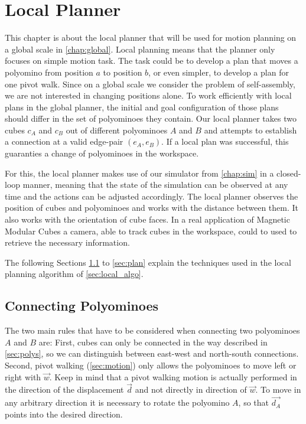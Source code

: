 \chapter{Local Planner}
\label{chap:local}

This chapter is about the local planner that will be used for motion planning on a global scale in \autoref{chap:global}.
Local planning means that the planner only focuses on simple motion task.
The task could be to develop a plan that moves a polyomino from position $a$ to position $b$, or even simpler, to develop a plan for one pivot walk.
Since on a global scale we consider the problem of self-assembly, we are not interested in changing positions alone.
To work efficiently with local plans in the global planner, the initial and goal configuration of those plans should differ in the set of polyominoes they contain.
Our local planner takes two cubes $c_A$ and $c_B$ out of different polyominoes $A$ and $B$ and attempts to establish a connection at a valid edge-pair $(e_A, e_B)$.
If a local plan was successful, this guaranties a change of polyominoes in the workspace.

For this, the local planner makes use of our simulator from \autoref{chap:sim} in a closed-loop manner, meaning that the state of the simulation can be observed at any time and the actions can be adjusted accordingly.
The local planner observes the position of cubes and polyominoes and works with the distance between them.
It also works with the orientation of cube faces.
In a real application of Magnetic Modular Cubes a camera, able to track cubes in the workspace, could to used to retrieve the necessary information. 

The following Sections \ref{sec:connect} to \ref{sec:plan} explain the techniques used in the local planning algorithm of \autoref{sec:local_algo}.

\section{Connecting Polyominoes}
\label{sec:connect}

The two main rules that have to be considered when connecting two polyominoes $A$ and $B$ are:
First, cubes can only be connected in the way described in \autoref{sec:polys}, so we can distinguish between east-west and north-south connections.
Second, pivot walking (\autoref{sec:motion}) only allows the polyominoes to move left or right with $\vec{w}$.
Keep in mind that a pivot walking motion is actually performed in the direction of the displacement $\vec{d}$ and not directly in direction of $\vec{w}$.
To move in any arbitrary direction it is necessary to rotate the polyomino $A$, so that $\vec{d_A}$ points into the desired direction.

